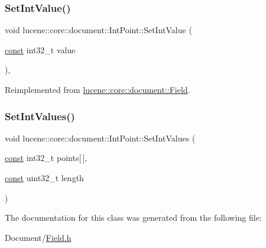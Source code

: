 \subsubsection{\texorpdfstring{Set\+Int\+Value()}{SetIntValue()}}
{\footnotesize\ttfamily void lucene\+::core\+::document\+::\+Int\+Point\+::\+Set\+Int\+Value (\begin{DoxyParamCaption}\item[{\mbox{\hyperlink{ZlibCrc32_8h_a2c212835823e3c54a8ab6d95c652660e}{const}} int32\+\_\+t}]{value }\end{DoxyParamCaption})\hspace{0.3cm}{\ttfamily [inline]}, {\ttfamily [virtual]}}



Reimplemented from \mbox{\hyperlink{classlucene_1_1core_1_1document_1_1Field_a6aee080f0bf507f8c6a5cfc64bd913a2}{lucene\+::core\+::document\+::\+Field}}.

\mbox{\label{classlucene_1_1core_1_1document_1_1IntPoint_a880e94ed4c6162b469cc23846ea8bc2e}} 
\subsubsection{\texorpdfstring{Set\+Int\+Values()}{SetIntValues()}}
{\footnotesize\ttfamily void lucene\+::core\+::document\+::\+Int\+Point\+::\+Set\+Int\+Values (\begin{DoxyParamCaption}\item[{\mbox{\hyperlink{ZlibCrc32_8h_a2c212835823e3c54a8ab6d95c652660e}{const}} int32\+\_\+t}]{points\mbox{[}$\,$\mbox{]},  }\item[{\mbox{\hyperlink{ZlibCrc32_8h_a2c212835823e3c54a8ab6d95c652660e}{const}} uint32\+\_\+t}]{length }\end{DoxyParamCaption})\hspace{0.3cm}{\ttfamily [inline]}}



The documentation for this class was generated from the following file\+:\begin{DoxyCompactItemize}
\item 
Document/\mbox{\hyperlink{Document_2Field_8h}{Field.\+h}}\end{DoxyCompactItemize}
